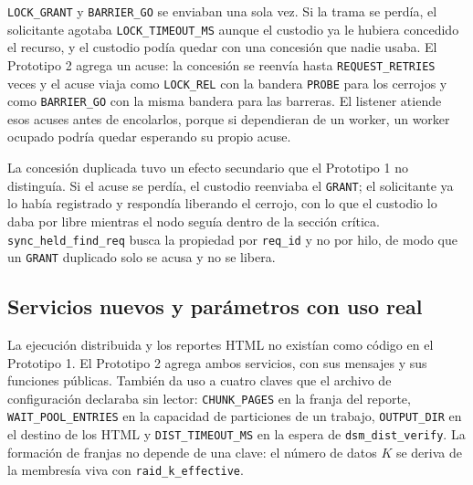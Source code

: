 \documentclass[11pt,spanish]{article}
\begin{document}
\texttt{LOCK\_GRANT} y \texttt{BARRIER\_GO} se enviaban una sola vez. Si la trama se perdía, el solicitante agotaba \texttt{LOCK\_TIMEOUT\_MS} aunque el custodio ya le hubiera concedido el recurso, y el custodio podía quedar con una concesión que nadie usaba. El Prototipo 2 agrega un acuse: la concesión se reenvía hasta \texttt{REQUEST\_RETRIES} veces y el acuse viaja como \texttt{LOCK\_REL} con la bandera \texttt{PROBE} para los cerrojos y como \texttt{BARRIER\_GO} con la misma bandera para las barreras. El listener atiende esos acuses antes de encolarlos, porque si dependieran de un worker, un worker ocupado podría quedar esperando su propio acuse.

La concesión duplicada tuvo un efecto secundario que el Prototipo 1 no distinguía. Si el acuse se perdía, el custodio reenviaba el \texttt{GRANT}; el solicitante ya lo había registrado y respondía liberando el cerrojo, con lo que el custodio lo daba por libre mientras el nodo seguía dentro de la sección crítica. \texttt{sync\_held\_find\_req} busca la propiedad por \texttt{req\_id} y no por hilo, de modo que un \texttt{GRANT} duplicado solo se acusa y no se libera.

\subsection{Servicios nuevos y parámetros con uso real}

La ejecución distribuida y los reportes HTML no existían como código en el Prototipo 1. El Prototipo 2 agrega ambos servicios, con sus mensajes y sus funciones públicas. También da uso a cuatro claves que el archivo de configuración declaraba sin lector: \texttt{CHUNK\_PAGES} en la franja del reporte, \texttt{WAIT\_POOL\_ENTRIES} en la capacidad de particiones de un trabajo, \texttt{OUTPUT\_DIR} en el destino de los HTML y \texttt{DIST\_TIMEOUT\_MS} en la espera de \texttt{dsm\_dist\_verify}. La formación de franjas no depende de una clave: el número de datos $K$ se deriva de la membresía viva con \texttt{raid\_k\_effective}.
\end{document}
